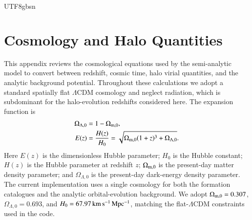 \documentclass[trackchanges, twocolappendix, twocolumn]{aastex701}
\begin{document}
\begin{CJK*}{UTF8}{gbsn}


\appendix

\section{Cosmology and Halo Quantities}
\label{app:cosmology_equations}

This appendix reviews the cosmological equations used by the semi-analytic model to convert between redshift, cosmic time, halo virial quantities, and the analytic background potential. Throughout these calculations we adopt a standard spatially flat $\Lambda$CDM cosmology and neglect radiation, which is subdominant for the halo-evolution redshifts considered here. The expansion function is
\begin{align}
\Omega_{\Lambda ,0} & = 1 - \Omega_{\rm m, 0} ,\\
E(z) & = \dfrac{H (z)}{H_0} = \sqrt{\Omega_{\rm m, 0} (1 + z)^3 + \Omega_{\Lambda, 0}} .
\end{align}
Here $E(z)$ is the dimensionless Hubble parameter; $H_0$ is the Hubble constant; $H(z)$ is the Hubble parameter at redshift $z$; $\Omega_{\rm m,0}$ is the present-day matter density parameter; and $\Omega_{\Lambda,0}$ is the present-day dark-energy density parameter. The current implementation uses a single cosmology for both the formation catalogues and the analytic orbital-evolution background. We adopt $\Omega_{\rm m,0}=0.307$, $\Omega_{\Lambda,0}=0.693$, and $H_0=67.97\,{\rm km\,s^{-1}\,Mpc^{-1}}$, matching the \cite{DESIcollaboration2025} flat-$\Lambda$CDM constraints used in the code. 


\end{CJK*}
\end{document}
